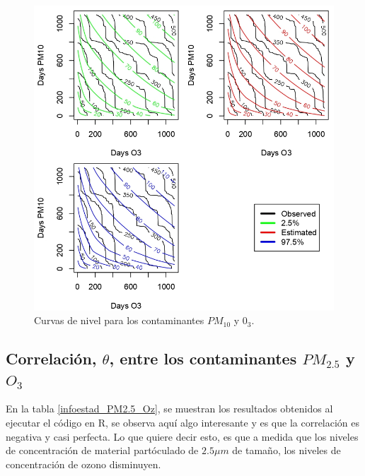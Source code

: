 \begin{figure}[!h]
\begin{center}
\includegraphics[scale=1]{cdnpm10vs03}
\end{center}
\centering
\caption{Curvas de nivel para los contaminantes $PM_{10}$ y $0_3$. \cite{EPA}}
\label{curv_niv_pm10_03}
\end{figure}



\newpage
\subsection{Correlación, $\theta$, entre los contaminantes $PM_{2.5}$ y $O_3$ }

En la tabla \ref{infoestad_PM2.5_Oz}, se muestran los resultados obtenidos al ejecutar el código en R, se observa aquí algo interesante y es que la correlación es negativa y casi perfecta. Lo que quiere decir esto, es que a medida que los niveles de concentración de material partóculado de $2.5 \mu m$ de tamaño, los niveles de concentración de ozono disminuyen.

